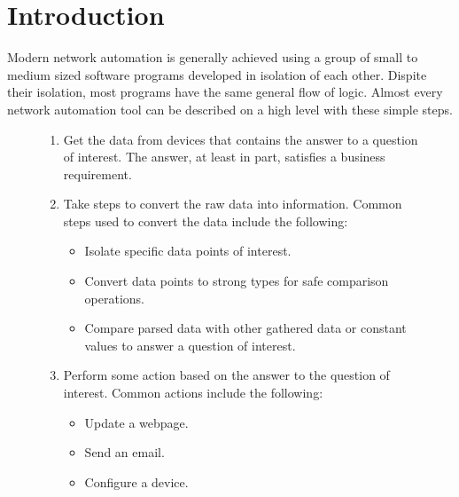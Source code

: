 %
\chapter{Introduction}\label{sec:intro}


Modern network automation is generally achieved using a group of small to medium
sized software programs developed in isolation of each other. Dispite their isolation,
most programs have the same general flow of logic. Almost every network automation
tool can be described on a high level with these simple steps.
\begin{figure}[h]
\begin{minipage}{.5\textwidth}
	\begin{enumerate}
		\item Get the data from devices that contains the answer to a 
			question of interest. The answer, at least in part, 
			satisfies a business requirement.
		\item Take steps to convert the raw data into information. 
			Common steps used to convert the data include the 
			following:
			\begin{itemize}[noitemsep]
				\item Isolate specific data points of interest.
				\item Convert data points to strong types for 
					safe comparison operations.
				\item Compare parsed data with other gathered 
					data or constant values to answer a 
					question of interest.
			\end{itemize}
		\item Perform some action based on the answer to the question 
			of interest. Common actions include the following:
			\begin{itemize}[noitemsep]
				\item Update a webpage.
				\item Send an email.
				\item Configure a device.
			\end{itemize}
	\end{enumerate}
\end{minipage}
\begin{minipage}{0.5\textwidth}

\end{minipage}
\end{figure}
